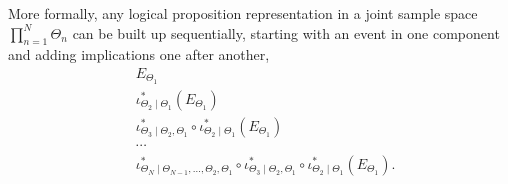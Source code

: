 More formally, any logical proposition representation in a joint sample space 
$\prod_{n = 1}^{N} \Theta_{n}$ can be built up sequentially, starting with an 
event in one component and adding implications one after another,
%
\begin{align*}
& E_{\Theta_{1}} \\
& \iota^{*}_{\Theta_{2} \mid \Theta_{1}} \! \left( E_{\Theta_{1}} \right) \\
& \iota^{*}_{\Theta_{3} \mid \Theta_{2}, \Theta_{1}} 
\circ
\iota^{*}_{\Theta_{2} \mid \Theta_{1}} \! \left( E_{\Theta_{1}} \right) \\
& \cdots \\
& \iota^{*}_{\Theta_{N} \mid \Theta_{N - 1}, \ldots, \Theta_{2}, \Theta_{1}}
\circ
\iota^{*}_{\Theta_{3} \mid \Theta_{2}, \Theta_{1}}  
\circ
\iota^{*}_{\Theta_{2} \mid \Theta_{1}} \! \left( E_{\Theta_{1}} \right).
\end{align*}

